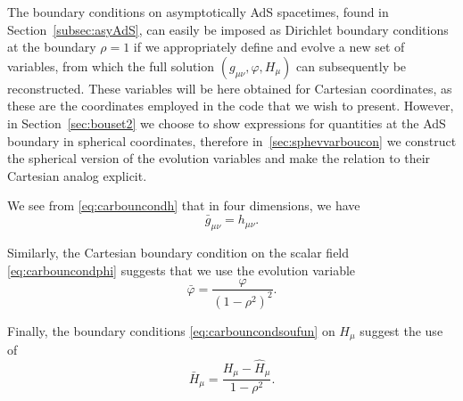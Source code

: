 \documentclass[a4paper,11pt]{article}
\begin{document}
The boundary conditions on asymptotically AdS spacetimes, found in Section~\ref{subsec:asyAdS}, can easily be imposed as Dirichlet boundary conditions at the boundary $\rho=1$ if we appropriately define and evolve a new set of variables, from which the full solution $(g_{\mu\nu},\varphi,H_\mu)$ can subsequently be reconstructed. %
These variables will be here obtained for Cartesian coordinates, as these are the coordinates employed in the code that we wish to present. However, in Section~\ref{sec:bouset2} we choose to show expressions for quantities at the AdS boundary in spherical coordinates, therefore in~\ref{sec:sphevvarboucon} we construct the spherical version of the evolution variables and make the relation to their Cartesian analog explicit.

We see from \eqref{eq:carbouncondh} that in four dimensions, we have 
\begin{equation}\label{eq:gbarcart}
\bar{g}_{\mu\nu}=h_{\mu\nu}.
\end{equation}

Similarly, the Cartesian boundary condition on the scalar field \eqref{eq:carbouncondphi} suggests that we use the evolution variable
\begin{equation}
\bar{\varphi}=\frac{\varphi }{(1-\rho^2)^2}.
\end{equation}

Finally, the boundary conditions \eqref{eq:carbouncondsoufun} on $H_\mu$ suggest the use of
\begin{equation}\label{eq:soufunb}
\bar{H}_\mu=\frac{H_\mu-\hat{H}_\mu}{1-\rho^2 }.
\end{equation}
\end{document}
